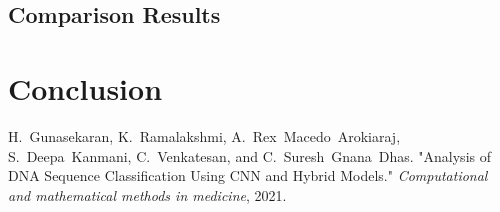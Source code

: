 \documentclass[journal]{IEEEtran}
\begin{document}
\subsection{Comparison Results}
\lipsum[1] %

\section{Conclusion}
\lipsum[1] %

\begin{thebibliography}{1}

H.~Gunasekaran, K.~Ramalakshmi, A.~Rex~Macedo~Arokiaraj, S.~Deepa~Kanmani, C.~Venkatesan, and C.~Suresh~Gnana~Dhas.
  "Analysis of DNA Sequence Classification Using CNN and Hybrid Models." 
  \emph{Computational and mathematical methods in medicine}, 2021.
\end{thebibliography}
\end{document}
